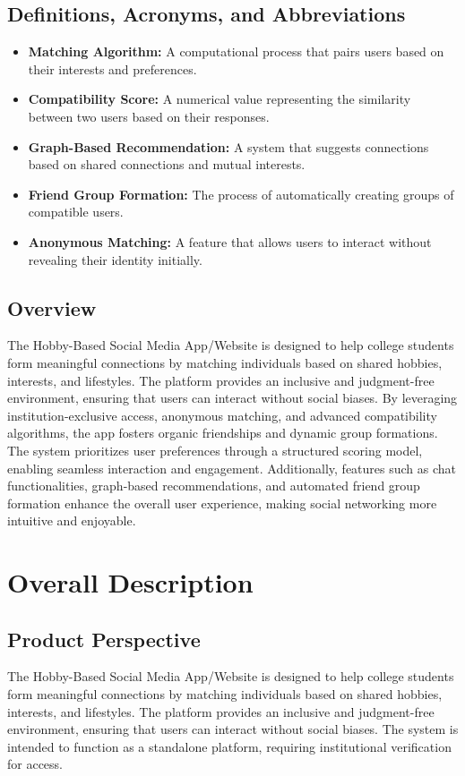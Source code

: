 \documentclass{article}
\begin{document}
  \subsection{Definitions, Acronyms, and Abbreviations}
  \begin{itemize}
    \item \textbf{Matching Algorithm:} A computational process that pairs users based on their interests and preferences.
    \item \textbf{Compatibility Score:} A numerical value representing the similarity between two users based on their responses.
    \item \textbf{Graph-Based Recommendation:} A system that suggests connections based on shared connections and mutual interests.
    \item \textbf{Friend Group Formation:} The process of automatically creating groups of compatible users.
    \item \textbf{Anonymous Matching:} A feature that allows users to interact without revealing their identity initially.
\end{itemize}
  
  \subsection{Overview}
    The Hobby-Based Social Media App/Website is designed to help college students form meaningful connections by matching individuals based on shared hobbies, interests, and lifestyles. The platform provides an inclusive and judgment-free environment, ensuring that users can interact without social biases. By leveraging institution-exclusive access, anonymous matching, and advanced compatibility algorithms, the app fosters organic friendships and dynamic group formations. The system prioritizes user preferences through a structured scoring model, enabling seamless interaction and engagement. Additionally, features such as chat functionalities, graph-based recommendations, and automated friend group formation enhance the overall user experience, making social networking more intuitive and enjoyable.
\section{Overall Description}

\subsection{Product Perspective}
The Hobby-Based Social Media App/Website is designed to help college students form meaningful connections by matching individuals based on shared hobbies, interests, and lifestyles. The platform provides an inclusive and judgment-free environment, ensuring that users can interact without social biases. The system is intended to function as a standalone platform, requiring institutional verification for access.
\end{document}
